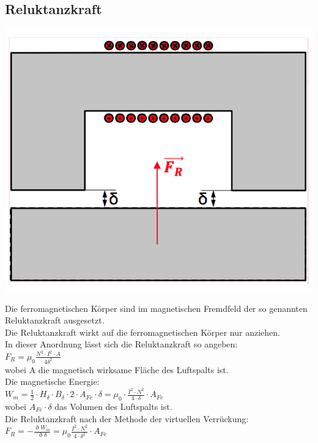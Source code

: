 \subsection{Reluktanzkraft}
\begin{minipage}{0.4 \linewidth}
\includegraphics[width = \linewidth]{./Pics/VL2/reluktanz}
\end{minipage}
\begin{minipage}{0.6 \linewidth}
Die ferromagnetischen Körper sind im magnetischen Fremdfeld der so genannten Reluktanzkraft ausgesetzt. \\

Die Reluktanzkraft wirkt auf die ferromagnetischen Körper nur anziehen. \\

In dieser Anordnung lässt sich die Reluktanzkraft so angeben: \\

$F_R  = \mu_0 \frac{N^2 \cdot I^2 \cdot A}{4 \delta^2}$ \\

wobei A die magnetisch wirksame Fläche des Luftspalts ist. \\

Die magnetische Energie:\\

$W_m = \frac{1}{2} \cdot H_\delta \cdot B_\delta \cdot 2 \cdot A_{Fe} \cdot \delta= \mu_0 \cdot \frac{I^2 \cdot N^2}{4 \cdot \delta} \cdot A_{Fe}$ \\ 

wobei $A_{Fe} \cdot \delta$ das Volumen des Luftspalts ist. \\

Die Reluktanzkraft nach der Methode der virtuellen Verrückung: \\

$F_R = - \frac{\eth W_m}{\eth \delta} = \mu_0 \frac{I^2 \cdot N^2}{4 \cdot \delta^2} \cdot A_{Fe}$
\end{minipage}

